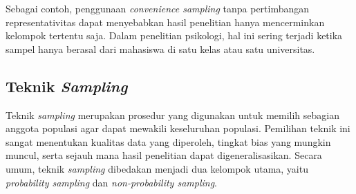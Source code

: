 \documentclass[
  indonesian,
  letterpaper,
  DIV=11,
  numbers=noendperiod]{scrreprt}
\begin{document}
Sebagai contoh, penggunaan \emph{convenience sampling} tanpa
pertimbangan representativitas dapat menyebabkan hasil penelitian hanya
mencerminkan kelompok tertentu saja. Dalam penelitian psikologi, hal ini
sering terjadi ketika sampel hanya berasal dari mahasiswa di satu kelas
atau satu universitas.

\subsection{\texorpdfstring{Teknik
\emph{Sampling}}{Teknik Sampling}}\label{teknik-sampling}

Teknik \emph{sampling} merupakan prosedur yang digunakan untuk memilih
sebagian anggota populasi agar dapat mewakili keseluruhan populasi.
Pemilihan teknik ini sangat menentukan kualitas data yang diperoleh,
tingkat bias yang mungkin muncul, serta sejauh mana hasil penelitian
dapat digeneralisasikan. Secara umum, teknik \emph{sampling} dibedakan
menjadi dua kelompok utama, yaitu \emph{probability sampling} dan
\emph{non-probability sampling}.
\end{document}
